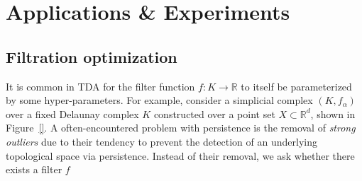 \documentclass[10pt]{article}
\numberwithin{equation}{section}
\newcommand{\+}{%
	\raisebox{0.18ex}{\scaleobj{0.55}{+}}
}
\newtheorem{corollary}{Corollary}
\theoremstyle{definition}
\theoremstyle{definition}
\begin{document}





\newpage

\newpage

\section{Applications \& Experiments}\label{sec:applications}


\subsection*{Filtration optimization}
It is common in TDA for the filter function $f : K \to \mathbb{R}$ to itself be parameterized by some hyper-parameters.
For example, consider a simplicial complex $(K, f_\alpha)$ over a fixed Delaunay complex $K$ constructed over a point set $X \subset \mathbb{R}^d$, shown in Figure~\ref{}. A often-encountered problem with persistence is the removal of \emph{strong outliers} due to their tendency to prevent the detection of an underlying topological space via persistence.
Instead of their removal, we ask whether there exists a filter $f$ 

\end{document}
